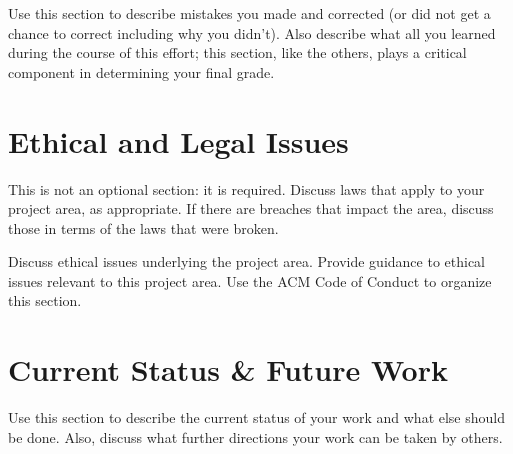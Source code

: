 \documentclass[sigconf]{acmart}
\begin{document}
Use this section to describe mistakes you made and corrected (or did
not get a chance to correct including why you didn't). Also describe
what all you learned during the course of this effort; this section,
like the others, plays a critical component in determining your final
grade.

\section{Ethical and Legal Issues}
\label{ethics-legal}

This is not an optional section: it is required. Discuss laws that
apply to your project area, as appropriate. If there are breaches that
impact the area, discuss those in terms of the laws that were broken.

Discuss ethical issues underlying the project area. Provide guidance
to ethical issues relevant to this project area. Use the ACM Code of Conduct
to organize this section.


\section{Current Status \& Future Work}
\label{current status and future work}

Use this section to describe the current status of your work
and what else should be done. Also, discuss what further directions
your work can be taken by others.
\end{document}
